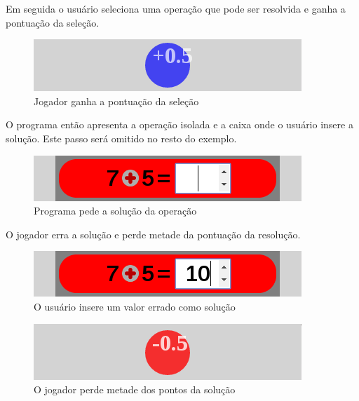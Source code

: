 Em seguida o usuário seleciona uma operação que pode ser resolvida e ganha a pontuação da seleção.

\begin{figure}[H]
	\caption{\label{score_0_5_1}Jogador ganha a pontuação da seleção}
	\begin{center}
	    \includegraphics[scale=1]{score_0_5.png}
	\end{center}
\end{figure}

O programa então apresenta a operação isolada e a caixa onde o usuário insere a solução. Este passo será omitido no resto do exemplo.

\begin{figure}[H]
	\caption{\label{xp_2}Programa pede a solução da operação}
	\begin{center}
	    \includegraphics[scale=1]{xp_4_2_asksol_1.png}
	\end{center}
\end{figure}

O jogador erra a solução e perde metade da pontuação da resolução.

\begin{figure}[H]
	\caption{\label{xp_3}O usuário insere um valor errado como solução}
	\begin{center}
	    \includegraphics[scale=1]{xp_4_3_wrongans_1.png}
	\end{center}
\end{figure}

\begin{figure}[H]
	\caption{\label{miss_0_5_2}O jogador perde metade dos pontos da solução}
	\begin{center}
	    \includegraphics[scale=1]{miss_0_5.png}
	\end{center}
\end{figure}

